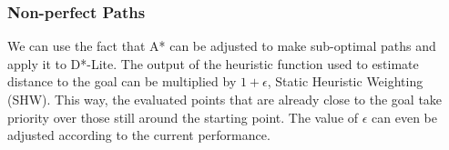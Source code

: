 \subsubsection{Non-perfect Paths}
We can use the fact that A* can be adjusted to make sub-optimal paths and apply it to D*-Lite. The output of the heuristic function used to estimate distance to the goal can be multiplied by $1 + \epsilon$, Static Heuristic Weighting (SHW). This way, the evaluated points that are already close to the goal take priority over those still around the starting point. The value of $\epsilon$ can even be adjusted according to the current performance.